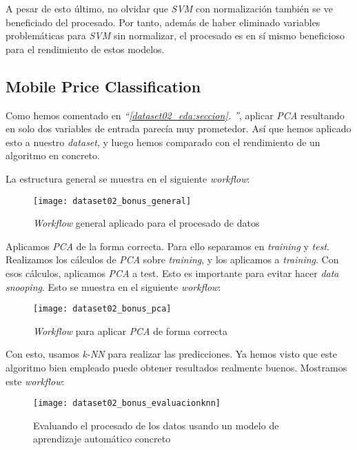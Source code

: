 \documentclass[11pt]{article}
\newcommand{\customcite}[1]{\emph{``\ref{#1}. \nameref{#1}''}}
\begin{document}
A pesar de esto último, no olvidar que \emph{SVM} con normalización también se ve beneficiado del procesado. Por tanto, además de haber eliminado variables problemáticas para \emph{SVM} sin normalizar, el procesado es en sí mismo beneficioso para el rendimiento de estos modelos.

\pagebreak

\subsection{Mobile Price Classification}

Como hemos comentado en \customcite{dataset02_eda:seccion}, aplicar \emph{PCA} resultando en solo dos variables de entrada parecía muy prometedor. Así que hemos aplicado esto a nuestro \emph{dataset}, y luego hemos comparado con el rendimiento de un algoritmo en concreto.

La estructura general se muestra en el siguiente \emph{workflow}:

\begin{figure}[h]
    \centering
    \texttt{[image: dataset02\_bonus\_general]}
    \caption{\emph{Workflow} general aplicado para el procesado de datos}
\end{figure}

Aplicamos \emph{PCA} de la forma correcta. Para ello separamos en \emph{training} y \emph{test}. Realizamos los cálculos de \emph{PCA} sobre \emph{training}, y los aplicamos a \emph{training}. Con esos cálculos, aplicamos \emph{PCA} a test. Esto es importante para evitar hacer \emph{data snooping}. Esto se muestra en el siguiente \emph{workflow}:

\begin{figure}[h]
    \centering
    \texttt{[image: dataset02\_bonus\_pca]}
    \caption{\emph{Workflow} para aplicar \emph{PCA} de forma correcta}
\end{figure}

Con esto, usamos \emph{k-NN} para realizar las predicciones. Ya hemos visto que este algoritmo bien empleado puede obtener resultados realmente buenos. Mostramos este \emph{workflow}:

\begin{figure}[H]
    \centering
    \texttt{[image: dataset02\_bonus\_evaluacionknn]}
    \caption{Evaluando el procesado de los datos usando un modelo de aprendizaje automático concreto}
\end{figure}
\end{document}

